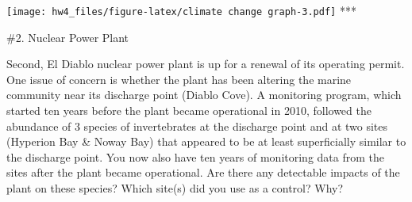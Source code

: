 \documentclass[]{article}
\newenvironment{Shaded}{\begin{snugshade}}{\end{snugshade}}
\newcommand{\CommentTok}[1]{\textcolor[rgb]{0.56,0.35,0.01}{\textit{#1}}}
\newcommand{\KeywordTok}[1]{\textcolor[rgb]{0.13,0.29,0.53}{\textbf{#1}}}
\newcommand{\NormalTok}[1]{#1}
\newcommand{\OperatorTok}[1]{\textcolor[rgb]{0.81,0.36,0.00}{\textbf{#1}}}
\newcommand{\StringTok}[1]{\textcolor[rgb]{0.31,0.60,0.02}{#1}}
\begin{document}
\texttt{[image: hw4\_files/figure-latex/climate change graph-3.pdf]} ***

\#2. Nuclear Power Plant

Second, El Diablo nuclear power plant is up for a renewal of its
operating permit. One issue of concern is whether the plant has been
altering the marine community near its discharge point (Diablo Cove). A
monitoring program, which started ten years before the plant became
operational in 2010, followed the abundance of 3 species of
invertebrates at the discharge point and at two sites (Hyperion Bay \&
Noway Bay) that appeared to be at least superficially similar to the
discharge point. You now also have ten years of monitoring data from the
sites after the plant became operational. Are there any detectable
impacts of the plant on these species? Which site(s) did you use as a
control? Why?

\begin{Shaded}
\end{Shaded}
\end{document}
